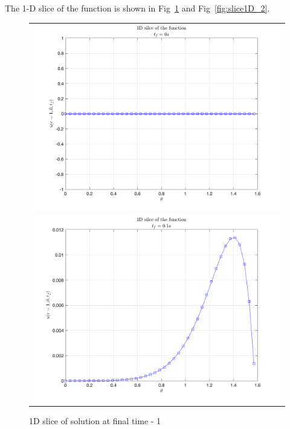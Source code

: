 \documentclass[11pt]{article}
\begin{document}
\begin{enumerate}
\begin{enumerate}
    The 1-D slice of the function is shown in Fig~\ref{fig:slice1D_1} and Fig~\ref{fig:slice1D_2}.
    \begin{figure}[htp]
        \centering
        \begin{tabular}{c}
            \includegraphics[width=5in]{Q2D_1.png}\\
            \includegraphics[width=5in]{Q2D_2.png}
        \end{tabular}
        \caption{1D slice of solution at final time - 1}
        \label{fig:slice1D_1}
    \end{figure}
    \begin{figure}[htp]
        \centering
        \begin{tabular}{c}

\end{tabular}
\end{figure}
\end{enumerate}
\end{enumerate}
\end{document}
